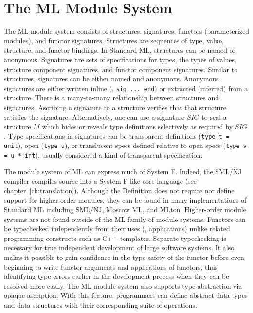 \section{The ML Module System}
The ML module system consists of structures, signatures, functors (parameterized modules), and functor signatures. Structures are sequences of type, value, structure, and functor bindings. In Standard ML, structures can be named or anonymous. Signatures are sets of specifications for types, the types of values, structure component signatures, and functor component signatures. Similar to structures, signatures can be either named and anonymous. Anonymous signatures are either written inline (\ie, \lstinline{sig ... end}) or extracted (inferred) from a structure. There is a many-to-many relationship between structures and signatures. Ascribing a signature to a structure verifies that that structure satisfies the signature. Alternatively, one can use a signature $SIG$ to seal a structure $M$ which hides or reveals type definitions selectively as required by $SIG$. Type specifications in signatures can be transparent definitions (\lstinline{type t = unit}), open  (\lstinline{type u}), or translucent specs defined relative to open specs (\lstinline{type v = u * int}), usually considered a kind of transparent specification. 

The module system of ML can express much of System F. Indeed, the SML/NJ compiler compiles source into a System F-like core language (see chapter~\ref{ch:translation}). Although the Definition\cite{mthm97} does not require nor define support for higher-order modules, they can be found in many implementations of Standard ML including SML/NJ, Moscow ML, and MLton. Higher-order module systems are not found outside of the ML family of module systems. Functors can be typechecked independently from their uses (\ie, applications) unlike related programming constructs such as C++ templates. Separate typechecking is necessary for true independent development of large software systems. It also makes it possible to gain confidence in the type safety of the functor before even beginning to write functor arguments and applications of functors, thus identifying type errors earlier in the development process when they can be resolved more easily. The ML module system also supports type abstraction via opaque ascription. With this feature, programmers can define abstract data types and data structures with their corresponding suite of operations. 

